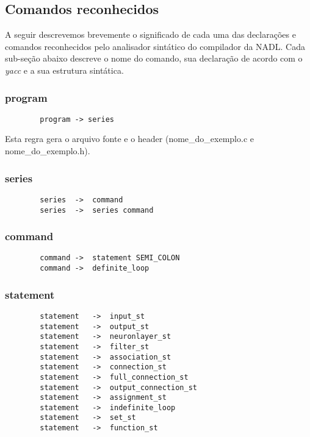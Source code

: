 \documentclass[a4paper,10pt]{article}
\begin{document}
	\subsection{Comandos reconhecidos}
A seguir descrevemos brevemente o significado de cada uma das declara\c{c}\~{o}es e comandos reconhecidos pelo analisador sint\'atico do compilador da NADL. Cada sub-se\c{c}\~{a}o abaixo descreve o nome do comando, sua declara\c{c}\~{a}o de acordo com o \textit{yacc} e a sua estrutura sint\'atica.
	\subsubsection{program}
		\begin{lstlisting}
		program -> series
		\end{lstlisting}
Esta regra gera o arquivo fonte e o header (nome\_do\_exemplo.c e nome\_do\_exemplo.h).
\vspace{10mm}
	\subsubsection{series}
		\begin{lstlisting}
		series	->	command 
		series	->	series command
		\end{lstlisting}
\vspace{10mm}
	\subsubsection{command}
		\begin{lstlisting}
		command	->	statement SEMI_COLON
		command	->	definite_loop 
		\end{lstlisting}
\vspace{10mm}
	\subsubsection{statement}
		\begin{lstlisting}
		statement	->	input_st
		statement	->	output_st
		statement	->	neuronlayer_st
		statement	->	filter_st
		statement	->	association_st
		statement	->	connection_st
		statement	->	full_connection_st
		statement	->	output_connection_st
		statement	->	assignment_st
		statement	->	indefinite_loop
		statement	->	set_st
		statement	->	function_st
		\end{lstlisting}
\vspace{10mm}
\end{document}
